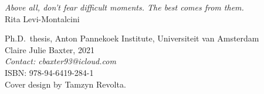 \cleardoublepage
\thispagestyle{empty}
\null\vfill\null

\hfill\parbox{125mm}{
\raggedleft\emph{\large Above all, don’t fear difficult moments. The best comes from them.}\\[5pt]
Rita Levi-Montalcini
}
\vfill
\clearpage
\thispagestyle{empty}
\newpage
\phantom{let's kill those trees}


\cleardoublepage
\thispagestyle{empty}
{\raggedright
  \small
  \noindent Ph.D.~thesis, Anton Pannekoek Institute, Universiteit van Amsterdam\\
  \noindent Claire Julie Baxter, 2021\\
    \noindent \textit{Contact: cbaxter93@icloud.com} \\[3ex]

  \noindent ISBN: 978-94-6419-284-1 \\[3ex]

  \noindent Cover design by Tamzyn Revolta.\\



}




\pagestyle{fancy}

